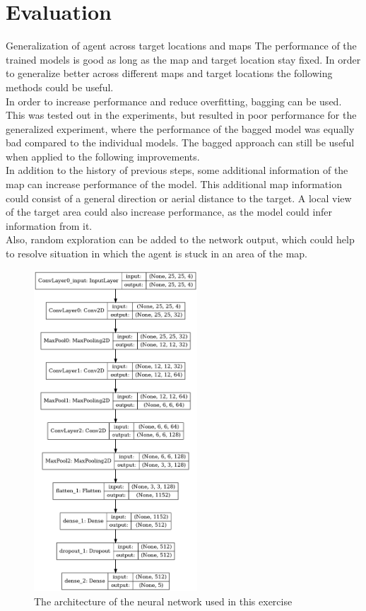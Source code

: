 \documentclass[a4paper, 11pt]{article}
\begin{document}


\section*{Evaluation}
Generalization of agent across target locations and maps
The performance of the trained models is good as long as the map and target location stay fixed. In order to generalize better across different maps and target locations the following methods could be useful.  \\
In order to increase performance and reduce overfitting, bagging can be used. This was tested out in the experiments, but resulted in poor performance for the generalized experiment, where the performance of the bagged model was equally bad compared to the individual models. The bagged approach can still be useful when applied to the following improvements.  \\
In addition to the history of previous steps, some additional information of the map can increase performance of the model. This additional map information could consist of a general direction or aerial distance to the target. A local view of the target area could also increase performance, as the model could infer information from it.  \\
Also, random exploration can be added to the network output, which could help to resolve situation in which the agent is stuck in an area of the map.



\begin{figure}[ht]
    \centering
    \includegraphics[height=12cm]{images/architecture.png}
        \caption{The architecture of the neural network used in this exercise}
        \label{fig:nn_arch}
\end{figure}
\end{document}

